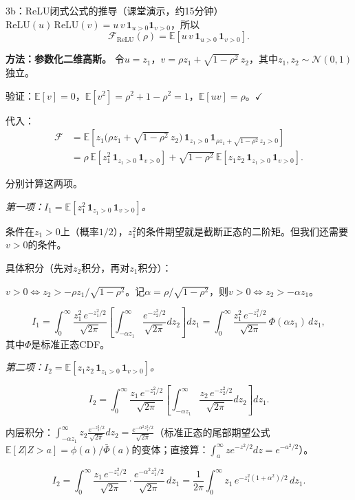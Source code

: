 \documentclass[11pt,a4paper]{article}
\newcommand{\E}{\mathbb{E}}
\newcommand{\cN}{\mathcal{N}}
\begin{document}
\begin{handcalc}{3b：ReLU闭式公式的推导（课堂演示，约15分钟）}
$\text{ReLU}(u)\,\text{ReLU}(v) = u\,v\,\mathbf{1}_{u>0}\mathbf{1}_{v>0}$，所以
\[
\mathcal{F}_{\text{ReLU}}(\rho) = \E[u\,v\,\mathbf{1}_{u>0}\,\mathbf{1}_{v>0}].
\]

\textbf{方法：参数化二维高斯。} 令$u=z_1$，$v=\rho z_1+\sqrt{1-\rho^2}\,z_2$，其中$z_1,z_2\sim\cN(0,1)$独立。

验证：$\E[v]=0$，$\E[v^2]=\rho^2+1-\rho^2=1$，$\E[uv]=\rho$。$\checkmark$

代入：
\begin{align}
\mathcal{F} &= \E\!\left[z_1\big(\rho z_1+\sqrt{1-\rho^2}\,z_2\big)\,\mathbf{1}_{z_1>0}\,\mathbf{1}_{\rho z_1+\sqrt{1-\rho^2}\,z_2>0}\right] \\
&= \rho\,\E[z_1^2\,\mathbf{1}_{z_1>0}\,\mathbf{1}_{v>0}] + \sqrt{1-\rho^2}\,\E[z_1 z_2\,\mathbf{1}_{z_1>0}\,\mathbf{1}_{v>0}].
\end{align}

分别计算这两项。

\medskip
\textit{第一项：$I_1 = \E[z_1^2\,\mathbf{1}_{z_1>0}\,\mathbf{1}_{v>0}]$。}

条件在$z_1>0$上（概率$1/2$），$z_1^2$的条件期望就是截断正态的二阶矩。但我们还需要$v>0$的条件。

具体积分（先对$z_2$积分，再对$z_1$积分）：

$v>0 \Leftrightarrow z_2 > -\rho z_1/\sqrt{1-\rho^2}$。记$\alpha=\rho/\sqrt{1-\rho^2}$，则$v>0\Leftrightarrow z_2>-\alpha z_1$。

\[
I_1 = \int_0^\infty \frac{z_1^2\,e^{-z_1^2/2}}{\sqrt{2\pi}}\left[\int_{-\alpha z_1}^\infty \frac{e^{-z_2^2/2}}{\sqrt{2\pi}}dz_2\right]dz_1 = \int_0^\infty \frac{z_1^2\,e^{-z_1^2/2}}{\sqrt{2\pi}}\,\Phi(\alpha z_1)\,dz_1,
\]
其中$\Phi$是标准正态CDF。

\medskip
\textit{第二项：$I_2 = \E[z_1 z_2\,\mathbf{1}_{z_1>0}\,\mathbf{1}_{v>0}]$。}

\[
I_2 = \int_0^\infty \frac{z_1\,e^{-z_1^2/2}}{\sqrt{2\pi}}\left[\int_{-\alpha z_1}^\infty \frac{z_2\,e^{-z_2^2/2}}{\sqrt{2\pi}}dz_2\right]dz_1.
\]

内层积分：$\int_{-\alpha z_1}^\infty z_2\frac{e^{-z_2^2/2}}{\sqrt{2\pi}}dz_2 = \frac{e^{-\alpha^2 z_1^2/2}}{\sqrt{2\pi}}$（标准正态的尾部期望公式$\E[Z|Z>a]=\phi(a)/\bar\Phi(a)$的变体；直接算：$\int_a^\infty z e^{-z^2/2}dz = e^{-a^2/2}$）。

\[
I_2 = \int_0^\infty \frac{z_1\,e^{-z_1^2/2}}{\sqrt{2\pi}}\cdot\frac{e^{-\alpha^2 z_1^2/2}}{\sqrt{2\pi}}\,dz_1 = \frac{1}{2\pi}\int_0^\infty z_1\,e^{-z_1^2(1+\alpha^2)/2}\,dz_1.
\]


\end{handcalc}
\end{document}
